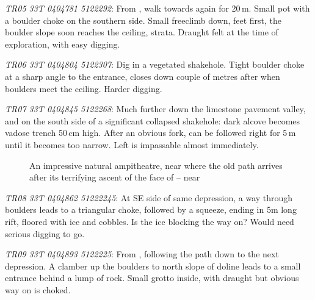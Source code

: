 \begin{citemize}
	\item \emph{TR05 33T 0404781 5122292}: From , walk towards  again for 20\,m. Small pot with a boulder choke on the southern side. Small freeclimb down, feet first, the boulder slope soon reaches the ceiling, strata. Draught felt at the time of exploration, with easy digging.

	\item \emph{TR06 33T 0404804 5122307}: Dig in a vegetated shakehole. Tight boulder choke at a sharp angle to the entrance, closes down couple of metres after when boulders meet the ceiling. Harder digging.

	\item \emph{TR07 33T 0404845 5122268}: Much further down the limestone pavement valley, and on the south side of a significant collapsed shakehole: dark alcove becomes vadose trench 50\,cm high. After an obvious fork, can be followed right for 5\,m until it becomes too narrow. Left is impassable almost immediately.
	\begin{figure*}[t!]
	\checkoddpage \ifoddpage \forcerectofloat \else \forceversofloat \fi
		\centering
		 \caption{An impressive natural ampitheatre, near where the old  path arrives after its terrifying ascent of the face of  -- near  }
		 \label{shakehole near M24}
	\end{figure*}


	\item \emph{TR08 33T 0404862 51222245}:  At SE side of same depression,  a way through boulders leads to a triangular choke, followed by a squeeze, ending in 5m long rift, floored with ice and cobbles. Is the ice blocking the way on? Would need serious digging to go.

	\item \emph{TR09 33T 0404893 5122225}: From , following the path down to the next depression. A clamber up the boulders to north slope of doline leads to a small entrance behind a lump of rock. Small grotto inside, with draught but obvious way on is choked.

\end{citemize}

